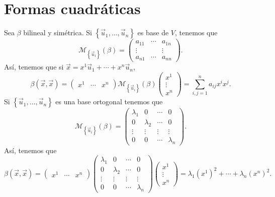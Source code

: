\section{Formas cuadráticas}
Sea $\displaystyle \beta  $ bilineal y simétrica. Si $\displaystyle \left\{ \vec{u}_{1}, \ldots, \vec{u}_{n}\right\}  $ es base de $\displaystyle V $, tenemos que 
\[ \mathcal{M}_{ \left\{ \vec{u}_{i}\right\} }\left(\beta \right)= \begin{pmatrix} a_{11} & \cdots & a_{1n}\\
\vdots & & \vdots \\
a_{n1} & \cdots & a_{nn}\end{pmatrix} .\]
Así, tenemos que si $\displaystyle \vec{x} = x^{1}\vec{u}_{1} + \cdots + x^{n}\vec{u}_{n} $, 
	\[\beta\left(\vec{x}, \vec{x}\right) = \begin{pmatrix} x^{1} & \cdots & x^{n} \end{pmatrix}\mathcal{M}_{ \left\{ \vec{u}_{i}\right\} }\left(\beta \right) \begin{pmatrix} x^{1} \\ \vdots \\ x^{n} \end{pmatrix} = \sum^{n}_{i,j = 1}a_{ij}x^{i}x^{j}.\]
 Si $\displaystyle \left\{ \vec{u}_{1}, \ldots, \vec{u}_{n}\right\}  $ es una base ortogonal tenemos que 
	\[ \mathcal{M}_{ \left\{ \vec{u}_{i}\right\} }\left(\beta \right) = \begin{pmatrix} \lambda_{1} & 0 & \cdots & 0 \\
	0 & \lambda_{2} & \cdots & 0 \\
\vdots & \vdots & \vdots & \vdots \\
0 & 0 & \cdots & \lambda_{n}\end{pmatrix} .\]
	Así, tenemos que 
		\[\beta\left(\vec{x}, \vec{x}\right) = \begin{pmatrix} x^{1} & \cdots & x^{n} \end{pmatrix}\begin{pmatrix} \lambda_{1} & 0 & \cdots & 0 \\
	0 & \lambda_{2} & \cdots & 0 \\
\vdots & \vdots & \vdots & \vdots \\
0 & 0 & \cdots & \lambda_{n}\end{pmatrix}\begin{pmatrix} x^{1} \\ \vdots \\ x^{n} \end{pmatrix} = \lambda_{1}\left(x^{1}\right)^{2} + \cdots + \lambda_{n}\left(x^{n}\right)^{2} .\]
